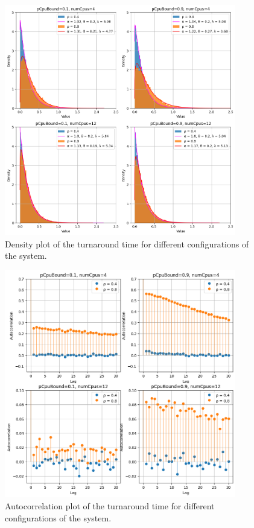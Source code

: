\begin{figure}[H]
    \captionsetup{type=figure}
    \centering
    \includegraphics[width=0.9\textwidth]{./images/04/fcfs/density.png}
    \caption{Density plot of the turnaround time for different configurations of the system.}
    \label{fig:fcfs_density}
\end{figure}

\begin{figure}[H]
    \captionsetup{type=figure}
    \centering
    \includegraphics[width=0.9\textwidth]{./images/04/fcfs/autocorrelation.png}
    \caption{Autocorrelation plot of the turnaround time for different configurations of the system.}
    \label{fig:fcfs_autocorrelation}
\end{figure}

